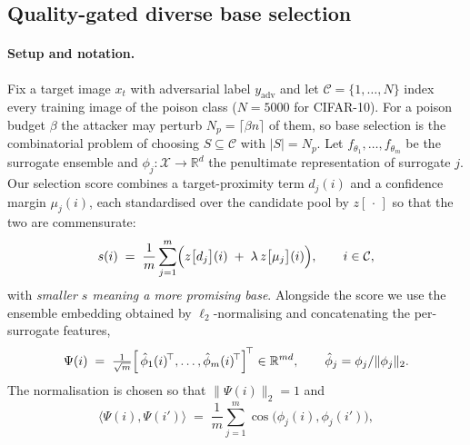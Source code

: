 
\subsection{Quality-gated diverse base selection}
\label{sec:filter}

\paragraph{Setup and notation.}
Fix a target image $x_t$ with adversarial label $y_{\mathrm{adv}}$ and let
$\mathcal{C}=\{1,\dots,N\}$ index every training image of the poison class
($N=5000$ for CIFAR-10).  For a poison budget $\beta$ the attacker may perturb
$N_p=\lceil\beta n\rceil$ of them, so base selection is the combinatorial
problem of choosing $S\subseteq\mathcal{C}$ with $|S|=N_p$.  Let
$f_{\theta_1},\dots,f_{\theta_m}$ be the surrogate ensemble and
$\phi_j:\mathcal{X}\to\mathbb{R}^{d}$ the penultimate representation of
surrogate $j$.  Our selection score combines a target-proximity term
$d_j(i)$ and a confidence margin $\mu_j(i)$, each standardised over the
candidate pool by $z[\,\cdot\,]$ so that the two are commensurate:
\begin{equation}
  s(i)\;=\;\frac{1}{m}\sum_{j=1}^{m}\Bigl(z\bigl[d_j\bigr](i)
        \;+\;\lambda\, z\bigl[\mu_j\bigr](i)\Bigr),
  \qquad i\in\mathcal{C},
  \label{eq:score}
\end{equation}
with \emph{smaller $s$ meaning a more promising base}.  Alongside the score we
use the ensemble embedding obtained by $\ell_2$-normalising and concatenating
the per-surrogate features,
\begin{equation}
  \Psi(i)\;=\;\tfrac{1}{\sqrt{m}}\Bigl[\,
      \hat\phi_1(i)^{\!\top},\dots,\hat\phi_m(i)^{\!\top}\Bigr]^{\!\top}
      \in\mathbb{R}^{md},
  \qquad \hat\phi_j=\phi_j/\lVert\phi_j\rVert_2 .
  \label{eq:embed}
\end{equation}
The normalisation is chosen so that $\lVert\Psi(i)\rVert_2=1$ and
\begin{equation}
  \bigl\langle\Psi(i),\Psi(i')\bigr\rangle
  \;=\;\frac{1}{m}\sum_{j=1}^{m}\cos\!\bigl(\phi_j(i),\phi_j(i')\bigr),
  \label{eq:meancos}
\end{equation}
